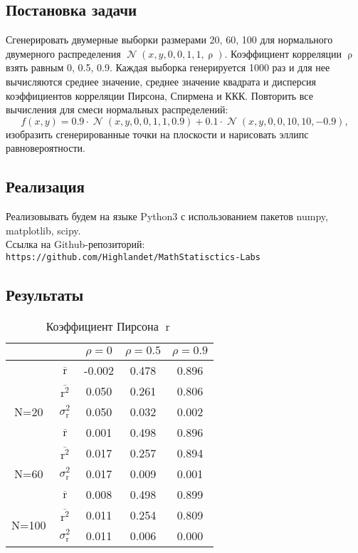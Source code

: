 \documentclass[14pt]{extarticle}
\DeclareMathOperator{\corr}{\rho} %
\DeclareMathOperator{\pirs}{r} %
\DeclareMathOperator{\normal}{\mathcal{N}} %
\begin{document}
\subsection{Постановка задачи}
Сгенерировать двумерные выборки размерами 20, 60, 100 для нормального двумерного распределения \(\normal(x, y, 0, 0, 1, 1, \corr)\). Коэффициент корреляции \(\corr\) взять равным 0, 0.5, 0.9. Каждая выборка генерируется 1000 раз и для нее вычисляются среднее значение, среднее значение квадрата и дисперсия коэффициентов корреляции Пирсона, Спирмена и ККК. Повторить все вычисления для смеси нормальных распределений: \[f(x, y)=0.9\cdot\normal(x, y, 0, 0, 1, 1, 0.9)+0.1\cdot\normal(x, y, 0, 0, 10, 10, -0.9),\] изобразить сгенерированные точки на плоскости и нарисовать эллипс равновероятности.

\subsection{Реализация}
Реализовывать будем на языке Python3 с использованием пакетов numpy, matplotlib, scipy. \\
Ссылка на Github-репозиторий: \\
\texttt{https://github.com/Highlandet/MathStatisctics-Labs}

\subsection{Результаты}
\begin{table}[H]
    \centering
    \begin{tabular}{|c|c|c|c|c|}
        \hline 
        &  & \(\rho=0\) & \(\rho=0.5\) & \(\rho=0.9\) \\
        \hline
        
        & \(\overline{\pirs}\) & -0.002 & 0.478 & 0.896 \\ \cline{2-5} 
        \multirow{3}{*}{N=20} & \(\overline{\pirs^2}\) & 0.050 & 0.261 & 0.806  \\ \cline{2-5} 
        &  \(\sigma_{\pirs}^2\) & 0.050 & 0.032 & 0.002 \\ \cline{1-5} 
        
        & \(\overline{\pirs}\) & 0.001 & 0.498 & 0.896 \\ \cline{2-5} 
        \multirow{3}{*}{N=60} & \(\overline{\pirs^2}\) & 0.017 & 0.257 & 0.894 \\ \cline{2-5} 
        &  \(\sigma_{\pirs}^2\) & 0.017 & 0.009 & 0.001 \\ \cline{1-5} 

        & \(\overline{\pirs}\) & 0.008 & 0.498 & 0.899 \\ \cline{2-5} 
        \multirow{3}{*}{N=100} & \(\overline{\pirs^2}\) & 0.011 & 0.254 & 0.809 \\ \cline{2-5} 
        &  \(\sigma_{\pirs}^2\) & 0.011 & 0.006 & 0.000 \\ \cline{1-5} 
        
        \end{tabular}
    \caption{Коэффициент Пирсона \(\pirs\)}
    \label{tab:my-table}
\end{table}
\end{document}

